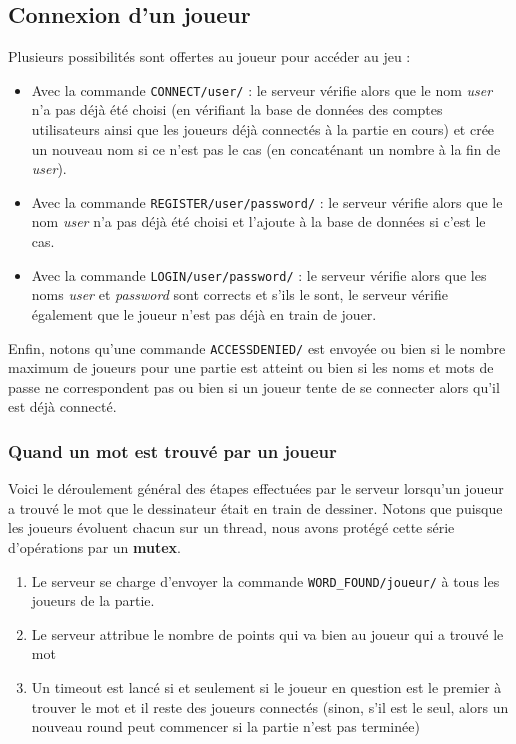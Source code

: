 \documentclass[a4paper, 11pt]{article}
\begin{document}
\subsection {Connexion d’un joueur}

Plusieurs possibilités sont offertes au joueur pour accéder au jeu :
\bigskip
\begin{itemize}
\item Avec la commande \verb+CONNECT/user/+ : le serveur vérifie alors
  que le nom \textit{user} n’a pas déjà été choisi (en vérifiant la
  base de données des comptes utilisateurs ainsi que les joueurs déjà
  connectés à la partie en cours) et crée un nouveau nom si ce n’est
  pas le cas (en concaténant un nombre à la fin de \textit{user}).
\item Avec la commande \verb+REGISTER/user/password/+ : le serveur
  vérifie alors que le nom \textit{user} n’a pas déjà été choisi et
  l’ajoute à la base de données si c’est le cas.
\item Avec la commande \verb+LOGIN/user/password/+ : le serveur
  vérifie alors que les noms \textit{user} et \textit{password} sont
  corrects et s’ils le sont, le serveur vérifie également que le
  joueur n’est pas déjà en train de jouer.
\end{itemize}
\bigskip Enfin, notons qu’une commande \verb+ACCESSDENIED/+ est
envoyée ou bien si le nombre maximum de joueurs pour une partie est
atteint ou bien si les noms et mots de passe ne correspondent pas ou
bien si un joueur tente de se connecter alors qu’il est déjà connecté.

\subsubsection {Quand un mot est trouvé par un joueur}

Voici le déroulement général des étapes effectuées par le serveur
lorsqu’un joueur a trouvé le mot que le dessinateur était en train de
dessiner. Notons que puisque les joueurs évoluent chacun sur un
thread, nous avons protégé cette série d’opérations par un
\textbf{mutex}.

\begin{enumerate}
\item Le serveur se charge d’envoyer la commande
  \verb+WORD_FOUND/joueur/+ à tous les joueurs de la partie.
\item Le serveur attribue le nombre de points qui va bien au joueur
  qui a trouvé le mot
\item Un timeout est lancé si et seulement si le joueur en question
  est le premier à trouver le mot et il reste des joueurs connectés
  (sinon, s’il est le seul, alors un nouveau round peut commencer si
  la partie n’est pas terminée)
\end{enumerate}
\end{document}
